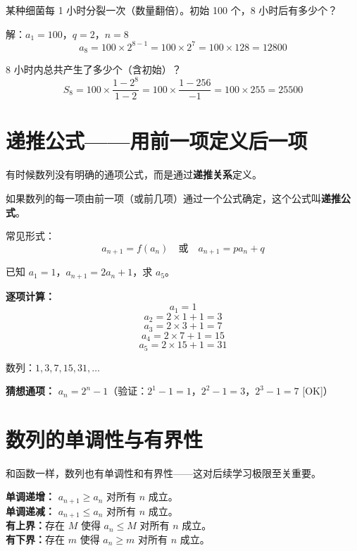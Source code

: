 \begin{examplebox}[5——等比数列的应用]
某种细菌每 1 小时分裂一次（数量翻倍）。初始 100 个，8 小时后有多少个？

解：\(a_1 = 100\)，\(q = 2\)，\(n = 8\)
\[
a_8 = 100 \times 2^{8-1} = 100 \times 2^7 = 100 \times 128 = 12800
\]

8 小时内总共产生了多少个（含初始）？
\[
S_8 = 100 \times \frac{1 - 2^8}{1 - 2} = 100 \times \frac{1 - 256}{-1} = 100 \times 255 = 25500
\]
\end{examplebox}


\section{递推公式——用前一项定义后一项}

有时候数列没有明确的通项公式，而是通过\textbf{递推关系}定义。

\begin{definitionbox}[递推公式]
如果数列的每一项由前一项（或前几项）通过一个公式确定，这个公式叫\textbf{递推公式}。

常见形式：
\[
a_{n+1} = f(a_n) \quad \text{或} \quad a_{n+1} = p a_n + q
\]
\end{definitionbox}

\begin{examplebox}[6——由递推求通项]
已知 \(a_1 = 1\)，\(a_{n+1} = 2a_n + 1\)，求 \(a_5\)。

\textbf{逐项计算：}
\[
a_1 = 1
\]
\[
a_2 = 2 \times 1 + 1 = 3
\]
\[
a_3 = 2 \times 3 + 1 = 7
\]
\[
a_4 = 2 \times 7 + 1 = 15
\]
\[
a_5 = 2 \times 15 + 1 = 31
\]

数列：\(1, 3, 7, 15, 31, \ldots\)

\textbf{猜想通项：} \(a_n = 2^n - 1\)（验证：\(2^1-1=1\)，\(2^2-1=3\)，\(2^3-1=7\) [OK]）
\end{examplebox}


\section{数列的单调性与有界性}

和函数一样，数列也有单调性和有界性——这对后续学习极限至关重要。

\begin{definitionbox}[数列的单调性与有界性]
\textbf{单调递增：} \(a_{n+1} \ge a_n\) 对所有 \(n\) 成立。\\
\textbf{单调递减：} \(a_{n+1} \le a_n\) 对所有 \(n\) 成立。\\
\textbf{有上界：}存在 \(M\) 使得 \(a_n \le M\) 对所有 \(n\) 成立。\\
\textbf{有下界：}存在 \(m\) 使得 \(a_n \ge m\) 对所有 \(n\) 成立。
\end{definitionbox}

